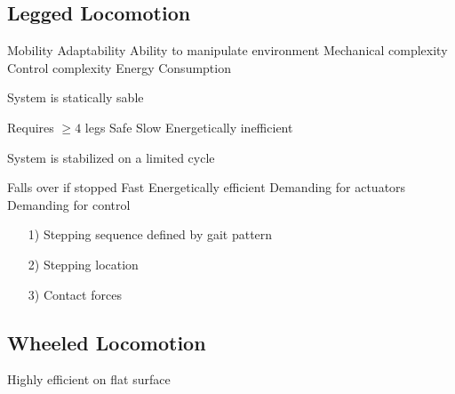 \subsection{Legged Locomotion}
\begin{itemize*}
    \ipro Mobility
    \ipro Adaptability
    \ipro Ability to manipulate environment
    \icon Mechanical complexity
    \icon Control complexity
    \icon Energy Consumption
\end{itemize*}
\begin{itemize}
        \begin{itemize*}
            \item System is statically sable
            \item Requires $\ge 4$ legs
            \ipro Safe
            \icon Slow
            \icon Energetically inefficient
        \end{itemize*}
        \begin{itemize*}
            \item System is stabilized on a limited cycle
            \item Falls over if stopped
            \ipro Fast
            \ipro Energetically efficient
            \icon Demanding for actuators
            \icon Demanding for control
        \end{itemize*}
        \begin{itemize}
            \item[1)] Stepping sequence defined by gait pattern
            \item[2)] Stepping location
            \item[3)] Contact forces
        \end{itemize}
\end{itemize}

\subsection{Wheeled Locomotion}
\begin{itemize*}
    \ipro Highly efficient on flat surface
\end{itemize*}

